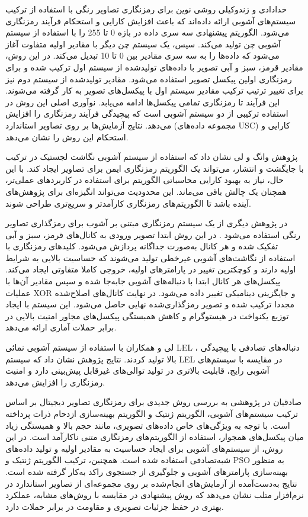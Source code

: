 خدادادی و زندوکیلی \cite{ref7} روشی نوین برای رمزنگاری تصاویر رنگی با استفاده از ترکیب سیستم‌های آشوبی ارائه داده‌اند که باعث افزایش کارایی و استحکام فرآیند رمزنگاری می‌شود. الگوریتم پیشنهادی سه سری داده در بازه 0 تا 255 را با استفاده از سیستم آشوبی چن تولید می‌کند. سپس، یک سیستم چن دیگر با مقادیر اولیه متفاوت آغاز می‌شود که داده‌ها را به سه سری مقادیر بین 0 تا 10 تبدیل می‌کند. در این روش، مقادیر قرمز، سبز و آبی تصویر با داده‌های تولیدشده از سیستم اول ترکیب شده و برای رمزنگاری اولین پیکسل تصویر استفاده می‌شود. مقادیر تولیدشده از سیستم دوم نیز برای تغییر ترتیب ترکیب مقادیر سیستم اول با پیکسل‌های تصویر به کار گرفته می‌شوند. این فرآیند تا رمزنگاری تمامی پیکسل‌ها ادامه می‌یابد. نوآوری اصلی این روش در استفاده ترکیبی از دو سیستم آشوبی است که پیچیدگی فرآیند رمزنگاری را افزایش می‌دهد. نتایج آزمایش‌ها بر روی تصاویر استاندارد (مجموعه داده‌های USC) کارایی و استحکام این روش را نشان می‌دهد.

پژوهش وانگ و لی \cite{ref8} نشان داد که استفاده از سیستم آشوبی نگاشت لجستیک در ترکیب با جایگشت و انتشار، می‌تواند یک الگوریتم رمزنگاری ایمن برای تصاویر ایجاد کند. با این حال، نیاز به بهبود کارایی محاسباتی الگوریتم برای استفاده در کاربردهای عملی‌تر، همچنان یک چالش باقی می‌ماند. این محدودیت می‌تواند انگیزه‌ای برای پژوهش‌های آینده باشد تا الگوریتم‌های رمزنگاری کارآمدتر و سریع‌تری طراحی شوند.

در پژوهش دیگری از یک سیستم رمزنگاری مبتنی بر آشوب برای رمزگذاری تصاویر رنگی استفاده می‌شود \cite{ref9}. در این روش ابتدا تصویر ورودی به کانال‌های قرمز، سبز و آبی تفکیک شده و هر کانال به‌صورت جداگانه پردازش می‌شود. کلیدهای رمزنگاری با استفاده از نگاشت‌های آشوبی غیرخطی تولید می‌شوند که حساسیت بالایی به شرایط اولیه دارند و کوچکترین تغییر در پارامترهای اولیه، خروجی کاملا متفاوتی ایجاد می‌کند. پیکسل‌های هر کانال ابتدا با دنباله‌های آشوبی جابه‌جا شده و سپس مقادیر آن‌ها با عملیات XOR و جایگزینی دینامیکی تغییر داده می‌شود. در نهایت کانال‌های اصلاح‌شده مجددا ترکیب شده و تصویر رمزگذاری‌شده نهایی حاصل می‌شود. این سیستم با ایجاد توزیع یکنواخت در هیستوگرام و کاهش همبستگی پیکسل‌های مجاور امنیت بالایی در برابر حملات آماری ارائه می‌دهد.

لی و همکاران \cite{ref10} با استفاده از سیستم آشوبی نمائی LEL ، دنباله‌های تصادفی با پیچیدگی بالا تولید کردند. نتایج پژوهش نشان داد که سیستم LEL در مقایسه با سیستم‌های آشوبی رایج، قابلیت بالاتری در تولید توالی‌های غیرقابل پیش‌بینی دارد و امنیت رمزنگاری را افزایش می‌دهد.

صادقیان \cite{ref11} در پژوهشی به بررسی روش جدیدی برای رمزنگاری تصاویر دیجیتال بر اساس ترکیب سیستم‌های آشوبی، الگوریتم ژنتیک و الگوریتم بهینه‌سازی ازدحام ذرات پرداخته است.  با توجه به ویژگی‌های خاص داده‌های تصویری، مانند حجم بالا و همبستگی زیاد میان پیکسل‌های همجوار، استفاده از الگوریتم‌های رمزنگاری متنی ناکارآمد است. در این روش، از سیستم‌های آشوبی برای ایجاد حساسیت به مقادیر اولیه و تولید داده‌های شبه‌تصادفی استفاده شده است. همچنین، ترکیب الگوریتم ژنتیک و PSO به منظور بهینه‌سازی پارامترهای آشوبی و جلوگیری از جستجوی راکد به‌کار گرفته شده است. نتایج به‌دست‌آمده از آزمایش‌های انجام‌شده بر روی مجموعه‌ای از تصاویر استاندارد در نرم‌افزار متلب نشان می‌دهد که روش پیشنهادی در مقایسه با روش‌های مشابه، عملکرد بهتری در حفظ جزئیات تصویری و مقاومت در برابر حملات دارد.

